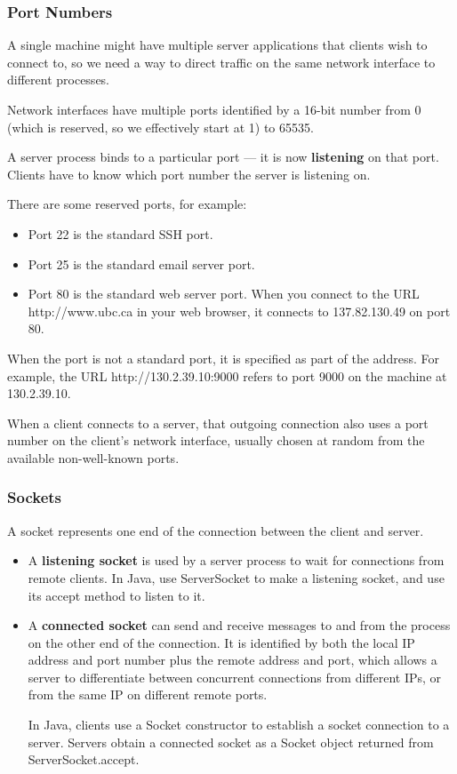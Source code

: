 \documentclass[letterpaper,12pt]{article}
\begin{document}
\subsubsection{Port Numbers}
A single machine might have multiple server applications that clients wish to connect to, so we need a way to direct traffic on the same network interface to different processes.

Network interfaces have multiple ports identified by a 16-bit number from 0 (which is reserved, so we effectively start at 1) to 65535.

A server process binds to a particular port — it is now \textbf{listening} on that port. Clients have to know which port number the server is listening on.

There are some reserved ports, for example:\begin{itemize}
      \item Port 22 is the standard SSH port.
      \item Port 25 is the standard email server port.
      \item Port 80 is the standard web server port. When you connect to the URL http://www.ubc.ca in your web browser, it connects to 137.82.130.49 on port 80.
\end{itemize}
When the port is not a standard port, it is specified as part of the address. For example, the URL http://130.2.39.10:9000 refers to port 9000 on the machine at 130.2.39.10.

When a client connects to a server, that outgoing connection also uses a port number on the client's network interface, usually chosen at random from the available non-well-known ports.

\subsubsection{Sockets}
A socket represents one end of the connection between the client and server.
\begin{itemize}
      \item A \textbf{listening socket} is used by a server process to wait for connections from remote clients. In Java, use ServerSocket to make a listening socket, and use its accept method to listen to it.
      \item A \textbf{connected socket} can send and receive messages to and from the process on the other end of the connection. It is identified by both the local IP address and port number plus the remote address and port, which allows a server to differentiate between concurrent connections from different IPs, or from the same IP on different remote ports.

            In Java, clients use a Socket constructor to establish a socket connection to a server. Servers obtain a connected socket as a Socket object returned from ServerSocket.accept.
\end{itemize}
\end{document}
